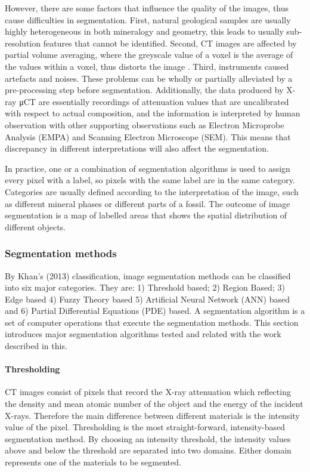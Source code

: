 However, there are some factors that influence the quality of the images, thus cause difficulties in segmentation. First, natural geological samples are usually highly heterogeneous in both mineralogy and geometry, this leads to usually sub-resolution features that cannot be identified. Second, CT images are affected by partial volume averaging, where the greyscale value of a voxel is the average of the values within a voxel, thus distorts the image \citep{barrett2004artifacts}. Third, instruments caused artefacts and noises. These problems can be wholly or partially alleviated by a pre-processing step before segmentation. Additionally, the data produced by X-ray μCT are essentially recordings of attenuation values that are uncalibrated with respect to actual composition, and the information is interpreted by human observation with other supporting observations such as Electron Microprobe Analysis (EMPA) and Scanning Electron Microscope (SEM). This means that discrepancy in different interpretations will also affect the segmentation. 

In practice, one or a combination of segmentation algorithms is used to assign every pixel with a label, so pixels with the same label are in the same category. Categories are usually defined according to the interpretation of the image, such as different mineral phases or different parts of a fossil. The outcome of image segmentation is a map of labelled areas that shows the spatial distribution of different objects. 

\subsubsection{Segmentation methods}
By Khan’s (2013) classification, image segmentation methods can be classified into six major categories. They are: 1) Threshold based; 2) Region Based; 3) Edge based 4) Fuzzy Theory based 5) Artificial Neural Network (ANN) based and 6) Partial Differential Equations (PDE) based. A segmentation algorithm is a set of computer operations that execute the segmentation methods. This section introduces major segmentation algorithms tested and related with the work described in this. 

\paragraph{Thresholding}
CT images consist of pixels that record the X-ray attenuation which reflecting the density and mean atomic number of the object and the energy of the incident X-rays. Therefore the main difference between different materials is the intensity value of the pixel. Thresholding is the most straight-forward, intensity-based segmentation method. By choosing an intensity threshold, the intensity values above and below the threshold are separated into two domains. Either domain represents one of the materials to be segmented. 

